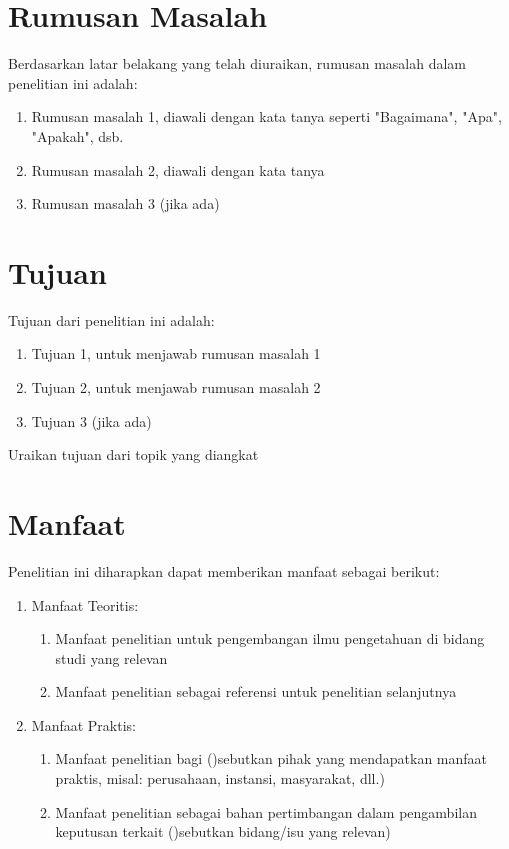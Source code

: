 \documentclass[english,12pt,a4paper]{book}
\begin{document}
\section{Rumusan Masalah}
Berdasarkan latar belakang yang telah diuraikan, rumusan masalah dalam penelitian ini adalah:
\begin{enumerate}
	\item Rumusan masalah 1, diawali dengan kata tanya seperti "Bagaimana", "Apa", "Apakah", dsb.
	\item Rumusan masalah 2, diawali dengan kata tanya
	\item Rumusan masalah 3 (jika ada)
\end{enumerate}
\section{Tujuan}
Tujuan dari penelitian ini adalah:
\begin{enumerate}
	\item Tujuan 1, untuk menjawab rumusan masalah 1
	\item Tujuan 2, untuk menjawab rumusan masalah 2
	\item Tujuan 3 (jika ada)
\end{enumerate}
Uraikan tujuan dari topik yang diangkat
\section{Manfaat}
Penelitian ini diharapkan dapat memberikan manfaat sebagai berikut:
\begin{enumerate}
	\item Manfaat Teoritis:
	\begin{enumerate}
		\item Manfaat penelitian untuk pengembangan ilmu pengetahuan di bidang studi yang relevan
		\item Manfaat penelitian sebagai referensi untuk penelitian selanjutnya
	\end{enumerate}
	\item Manfaat Praktis:
\begin{enumerate}
	\item Manfaat penelitian bagi ()sebutkan pihak yang mendapatkan manfaat praktis, misal: perusahaan, instansi, masyarakat, dll.)
	\item Manfaat penelitian sebagai bahan pertimbangan dalam pengambilan keputusan terkait ()sebutkan bidang/isu yang relevan)
\end{enumerate}
\end{enumerate}
\end{document}

